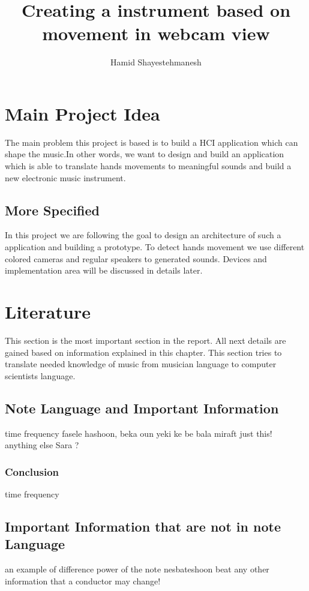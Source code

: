 \documentclass{report}
\begin{document}
\author{Hamid Shayestehmanesh}
\title{Creating a instrument based on movement in webcam view}
\maketitle
\tableofcontents
\newpage

\section{Main Project Idea}
The main problem this project is based is to build a HCI application which can shape the music.In other words, we want to design and build an application which is able to translate hands movements to meaningful sounds and build a new electronic music instrument.
\subsection{More Specified}
In this project we are following the goal to design an architecture of such a application and building a prototype. To detect hands movement we use different colored cameras and regular speakers to generated sounds. Devices and implementation area will be discussed in details later.
\pagebreak


\section{Literature}
This section is the most important section in the report. All next details are gained based on information explained in this chapter. This section tries to translate needed knowledge of music from musician language to computer scientists language. 
\subsection{Note Language and Important Information}
time
frequency
fasele hashoon, 
beka
oun yeki ke be bala miraft
just this!
anything else Sara ?
\subsubsection{Conclusion}
time 
frequency


\subsection{Important Information that are not in note Language}
an example of difference
power of the note
nesbateshoon
beat
any other information that a conductor may change!
\end{document}
